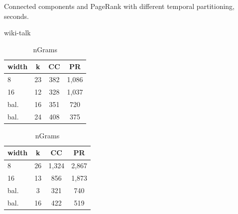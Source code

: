 \begin{table}
\centering
\caption{Connected components and PageRank with different temporal partitioning, seconds.}
\vspace{-0.2cm}
\begin{subtable}{0.229\textwidth}
\small
\caption{wiki-talk}
\vspace{-0.1cm}
\begin{tabular}{| l | c | c | c |}
\hline
\multicolumn{1}{|l|}{\bfseries width} & \multicolumn{1}{c|}{\bfseries k} & \multicolumn{1}{c|}{\bfseries CC} & \multicolumn{1}{c|}{\bfseries PR} \\ \hline
8 & 23 & 382 & 1,086 \\ \hline
16 & 12 & 328 & 1,037 \\ \hline
bal. & 16 & 351 & 720 \\ \hline
bal. & 24 & 408 & 375 \\ \hline
\end{tabular}
\label{fig:splitwiki}
\end{subtable}
\begin{subtable}{0.229\textwidth}
\small
\caption{nGrams}
\vspace{-0.1cm}
\begin{tabular}{| l | c | c | c |}
\hline
\multicolumn{1}{|l|}{\bfseries width} & \multicolumn{1}{c|}{\bfseries k} & \multicolumn{1}{c|}{\bfseries CC} & \multicolumn{1}{c|}{\bfseries PR} \\ \hline
8 & 26 & 1,324 & 2,867 \\ \hline
16 & 13 & 856 & 1,873  \\ \hline
bal. & 3 & 321 & 740  \\ \hline
bal. & 16 & 422 & 519 \\ \hline
\end{tabular}
\label{fig:splitngrams}
\end{subtable}
\label{tab:splitres}
\vspace{-0.4cm}
\end{table}


